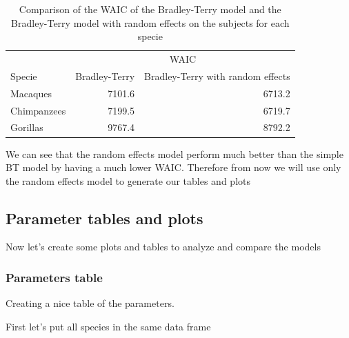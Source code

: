 \documentclass[
]{book}
\begin{document}
\begin{table}

\caption{\label{tab:unnamed-chunk-59}Comparison of the WAIC of the Bradley-Terry model and the Bradley-Terry model with random effects on the subjects for each specie}
\centering
\begin{tabular}[t]{lrr}
\toprule
\multicolumn{1}{c}{ } & \multicolumn{2}{c}{WAIC} \\
\cmidrule(l{3pt}r{3pt}){2-3}
Specie & Bradley-Terry & Bradley-Terry with random effects\\
\midrule
Macaques & 7101.6 & 6713.2\\
Chimpanzees & 7199.5 & 6719.7\\
Gorillas & 9767.4 & 8792.2\\
\bottomrule
\end{tabular}
\end{table}

We can see that the random effects model perform much better than the simple BT model by having a much lower WAIC. Therefore from now we will use only the random effects model to generate our tables and plots

\hypertarget{parameter-tables-and-plots}{%
\subsection{Parameter tables and plots}\label{parameter-tables-and-plots}}

Now let's create some plots and tables to analyze and compare the models

\hypertarget{parameters-table}{%
\subsubsection{Parameters table}\label{parameters-table}}

Creating a nice table of the parameters.

First let's put all species in the same data frame
\end{document}
